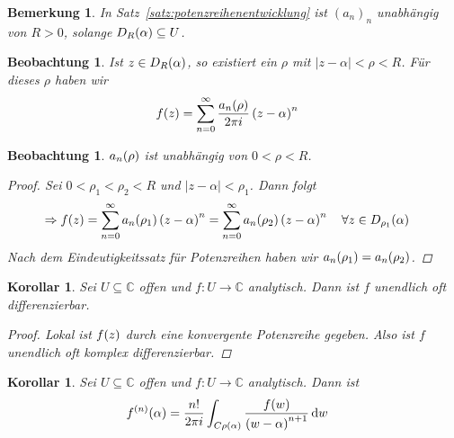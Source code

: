 \documentclass[11pt, a4paper]{article}
\theoremstyle{plain}
\newtheorem{bemerkung}[blockelement]{Bemerkung}
\newtheorem{korollar}[blockelement]{Korollar}
\newtheorem{beobachtung}[blockelement]{Beobachtung}
\numberwithin{equation}{subsection}
\newcommand{\pair}[1]{\left(#1\right)}
\newcommand{\of}[1]{\mathopen{}\mathclose{}\bgroup\left(#1\aftergroup\egroup\right)}
\newcommand{\abs}[1]{\left\lvert#1\right\rvert}
\newcommand{\impl}[0]{\Rightarrow{}}
\newcommand{\dif}{\mathop{}\!\mathrm{d}}
\newcommand{\C}{\mathbb{C}}
\begin{document}
    \begin{bemerkung}
        In Satz~\ref{satz:potenzreihenentwicklung} ist $(a_n)_n$ unabhängig von $ R > 0$, solange $D_R\of{\alpha}\subseteq U$.
    \end{bemerkung}

    \begin{beobachtung}
        Ist $z\in D_R\of{\alpha}$, so existiert ein $\rho$ mit $\abs{z-\alpha} < \rho < R$. Für dieses $\rho$ haben wir
        \begin{align*}
            f\of{z} &= \sum_{n=0}^{\infty} \frac{a_n\of{\rho}}{2\pi i}\pair{z-\alpha}^n
        \end{align*}
    \end{beobachtung}

    \begin{beobachtung}
        $a_n\of{\rho}$ ist unabhängig von $0 < \rho < R$.

        \begin{proof}
            Sei $0 < \rho_1 < \rho_2 < R$ und $\abs{z-\alpha} < \rho_1$. Dann folgt
            \begin{align*}
                \impl f\of{z} &= \sum_{n=0}^{\infty} a_n\of{\rho_1}\pair{z-\alpha}^n = \sum_{n=0}^{\infty} a_n\of{\rho_2}\pair{z-\alpha}^n\quad\forall z\in D_{\rho_1}\of{\alpha}
            \end{align*}
            Nach dem Eindeutigkeitssatz für Potenzreihen haben wir $a_n\of{\rho_1} = a_n\of{\rho_2}$.
        \end{proof}
    \end{beobachtung}

    \begin{korollar} %
        Sei $U\subseteq\C$ offen und $f: U \to\C$ analytisch. Dann ist $f$ unendlich oft differenzierbar.

        \begin{proof}
            Lokal ist $f\of{z}$ durch eine konvergente Potenzreihe gegeben. Also ist $f$ unendlich oft komplex differenzierbar.
        \end{proof}
    \end{korollar}

    \begin{korollar}
        \marginnote{[13. Mai]}
        Sei $U\subseteq\C$ offen und $f: U \to\C$ analytisch. Dann ist
        \begin{align*}
            f^{(n)}\of{\alpha} &= \frac{n!}{2\pi i} \int_{C\rho\of{\alpha}}^{} \frac{f\of{w}}{\pair{w-\alpha}^{n+1}} \dif w
        \end{align*}
    \end{korollar}
\end{document}
